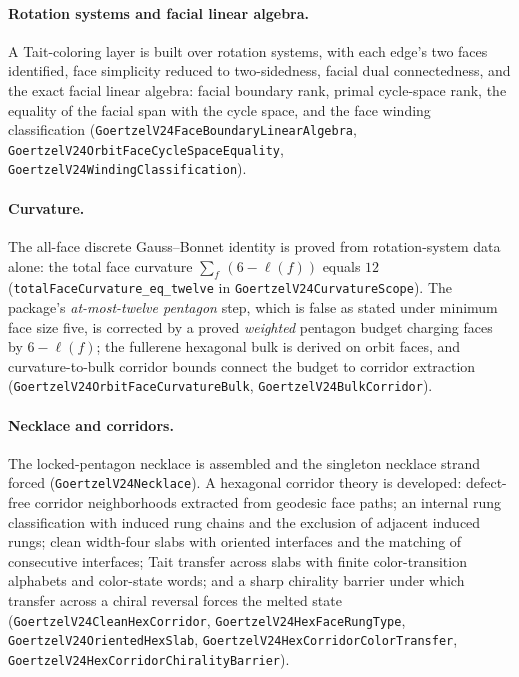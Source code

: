 \documentclass[11pt]{article}
\theoremstyle{definition}
\begin{document}
\paragraph{Rotation systems and facial linear algebra.} A Tait-coloring
layer is built over rotation systems, with each edge's two faces identified,
face simplicity reduced to two-sidedness, facial dual connectedness, and the
exact facial linear algebra: facial boundary rank, primal cycle-space rank,
the equality of the facial span with the cycle space, and the face winding
classification (\texttt{GoertzelV24FaceBoundaryLinearAlgebra},
\texttt{GoertzelV24OrbitFaceCycleSpaceEquality},
\texttt{GoertzelV24WindingClassification}).

\paragraph{Curvature.} The all-face discrete Gauss--Bonnet identity is
proved from rotation-system data alone: the total face curvature
$\sum_f\,(6-\ell(f))$ equals $12$ (\texttt{totalFaceCurvature\_eq\_twelve} in
\texttt{GoertzelV24CurvatureScope}). The package's \emph{at-most-twelve
pentagon} step, which is false as stated under minimum face size five, is
corrected by a proved \emph{weighted} pentagon budget charging faces by
$6-\ell(f)$; the fullerene hexagonal bulk is derived on orbit faces, and
curvature-to-bulk corridor bounds connect the budget to corridor extraction
(\texttt{GoertzelV24OrbitFaceCurvatureBulk}, \texttt{GoertzelV24BulkCorridor}).

\paragraph{Necklace and corridors.} The locked-pentagon necklace is
assembled and the singleton necklace strand forced
(\texttt{GoertzelV24Necklace}). A hexagonal corridor theory is developed:
defect-free corridor neighborhoods extracted from geodesic face paths; an
internal rung classification with induced rung chains and the exclusion of
adjacent induced rungs; clean width-four slabs with oriented interfaces and
the matching of consecutive interfaces; Tait transfer across slabs with
finite color-transition alphabets and color-state words; and a sharp
chirality barrier under which transfer across a chiral reversal forces the
melted state (\texttt{GoertzelV24CleanHexCorridor},
\texttt{GoertzelV24HexFaceRungType}, \texttt{GoertzelV24OrientedHexSlab},
\texttt{GoertzelV24HexCorridorColorTransfer},
\texttt{GoertzelV24HexCorridorChiralityBarrier}).
\end{document}
